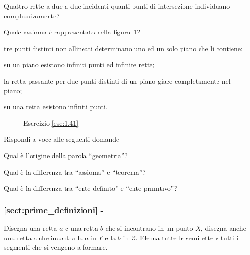\begin{esercizio}
\label{ese:1.40}
Quattro rette a due a due incidenti quanti punti di intersezione 
individuano complessivamente?
\end{esercizio}

\begin{esercizio}
\label{ese:1.41}
Quale assioma è rappresentato nella figura~\ref{fig:ese1.41}?
\begin{enumeratea}
\item tre punti distinti non allineati determinano uno ed un solo 
piano che li contiene;
\item su un piano esistono infiniti punti ed infinite rette;
\item la retta passante per due punti distinti di un piano giace 
completamente nel piano;
\item su una retta esistono infiniti punti.
\end{enumeratea}
\end{esercizio}


\begin{inaccessibleblock}
 \begin{figure}[htb]
 \centering
 \caption{Esercizio \ref{ese:1.41}}\label{fig:ese1.41}
\end{figure}
\end{inaccessibleblock}

\begin{esercizio}
\label{ese:1.42}
Rispondi a voce alle seguenti domande
\begin{enumeratea}
\item Qual è l'origine della parola ``geometria''?
\item Qual è la differenza tra ``assioma'' e ``teorema''?
\item Qual è la differenza tra ``ente definito'' e ``ente primitivo''?
\end{enumeratea}
\end{esercizio}

\begingroup
\hypersetup{linkcolor=black}
\subsubsection*{\ref{sect:prime_definizioni} - 
}
\endgroup

\begin{esercizio}
\label{ese:1.43}
Disegna una retta \(a\) e una retta \(b\) che si incontrano in un punto 
\(X\), disegna anche una retta \(c\) che incontra la \(a\) in \(Y\) e la \(b\) 
in \(Z\). Elenca tutte le semirette e tutti i segmenti che si vengono a 
formare.
\end{esercizio}

